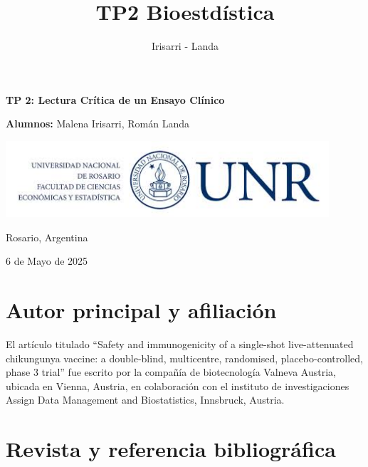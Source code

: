 \documentclass[
]{article}
\title{TP2 Bioestdística}
\author{Irisarri - Landa}
\date{}
\begin{document}
\maketitle

\thispagestyle{empty}

\begin{center}
  \vspace*{1cm}

  \Huge
  \textbf{TP 2: Lectura Crítica de un Ensayo Clínico}

  \vspace{0.5cm}
  \LARGE

  \vspace{1.5cm}

  \textbf{Alumnos:}  Malena Irisarri, Román Landa\\

  \vfill

  \includegraphics[width=0.9\textwidth]{img/logo_universidad.jpg}

  \vspace{0.8cm}


  Rosario, Argentina

  6 de Mayo de 2025
\end{center}

\newpage

\section{Autor principal y
afiliación}\label{autor-principal-y-afiliaciuxf3n}

El artículo titulado ``Safety and immunogenicity of a single-shot
live-attenuated chikungunya vaccine: a double-blind, multicentre,
randomised, placebo-controlled, phase 3 trial'' fue escrito por la
compañía de biotecnología Valneva Austria, ubicada en Vienna, Austria,
en colaboración con el instituto de investigaciones Assign Data
Management and Biostatistics, Innsbruck, Austria.

\section{Revista y referencia
bibliográfica}\label{revista-y-referencia-bibliogruxe1fica}
\end{document}
